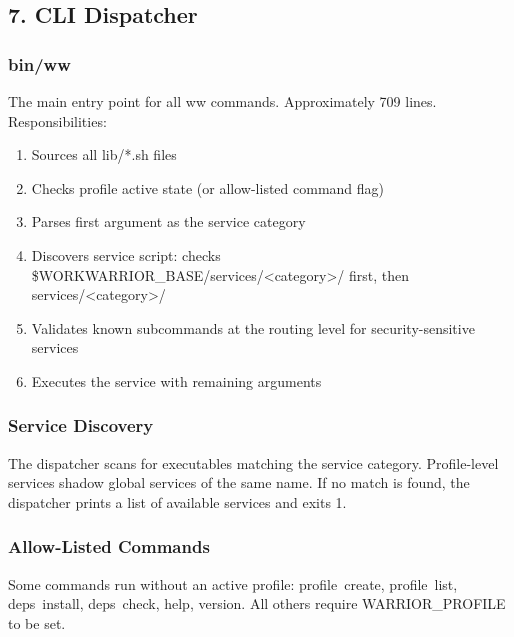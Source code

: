 \documentclass[11pt, a4paper, DIV=14]{scrartcl}
\renewcommand{\texttt}[1]{{\ttfamily\fontsize{8.5}{10.5}\selectfont\color{BabbNavy}#1}}
\begin{document}
\subsection{7. CLI Dispatcher}\label{cli-dispatcher}

\subsubsection{bin/ww}\label{binww}

The main entry point for all \texttt{ww} commands. Approximately 709
lines. Responsibilities:

\begin{enumerate}
\def\labelenumi{\arabic{enumi}.}
\tightlist
\item
  Sources all \texttt{lib/*.sh} files
\item
  Checks profile active state (or allow-listed command flag)
\item
  Parses first argument as the service category
\item
  Discovers service script: checks
  \texttt{\$WORKWARRIOR\_BASE/services/\textless{}category\textgreater{}/}
  first, then \texttt{services/\textless{}category\textgreater{}/}
\item
  Validates known subcommands at the routing level for
  security-sensitive services
\item
  Executes the service with remaining arguments
\end{enumerate}

\subsubsection{Service Discovery}\label{service-discovery}

The dispatcher scans for executables matching the service category.
Profile-level services shadow global services of the same name. If no
match is found, the dispatcher prints a list of available services and
exits 1.

\subsubsection{Allow-Listed Commands}\label{allow-listed-commands}

Some commands run without an active profile: \texttt{profile\ create},
\texttt{profile\ list}, \texttt{deps\ install}, \texttt{deps\ check},
\texttt{help}, \texttt{version}. All others require
\texttt{WARRIOR\_PROFILE} to be set.
\end{document}
